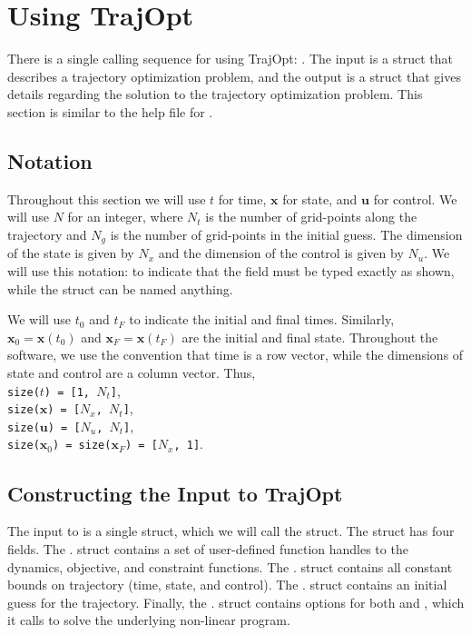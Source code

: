 \section{Using TrajOpt}

There is a single calling sequence for using TrajOpt:  . The input  is a struct that describes a trajectory optimization problem, and the output  is a struct that gives details regarding the solution to the trajectory optimization problem. This section is similar to the help file for .

\subsection{Notation}

Throughout this section we will use $t$ for time, $\bm{x}$ for state, and $\bm{u}$ for control. We will use $N$ for an integer, where $N_t$ is the number of grid-points along the trajectory and $N_g$ is the number of grid-points in the initial guess. The dimension of the state is given by $N_x$ and the dimension of the control is given by $N_u$. We will use this notation:  to indicate that the field  must be typed exactly as shown, while the struct  can be named anything.

\par We will use $t_0$ and $t_F$ to indicate the initial and final times. Similarly, $\bm{x}_0 = \bm{x}(t_0)$ and $\bm{x}_F = \bm{x}(t_F)$ are the initial and final state. Throughout the software, we use the convention that time is a row vector, while the dimensions of state and control are a column vector. Thus, \\
\texttt{size($t$) = [1, $N_t$]}, \\
\texttt{size($\bm{x}$) = [$N_x$, $N_t$]}, \\
\texttt{size($\bm{u}$) = [$N_u$, $N_t$]}, \\
\texttt{size($\bm{x}_0$) = size($\bm{x}_F$)  = [$N_x$, 1]}. 


\subsection{Constructing the Input to TrajOpt}

The input to  is a single struct, which we will call the  struct. The  struct has four fields. The . struct contains a set of user-defined function handles to the dynamics, objective, and constraint functions. The . struct contains all constant bounds on trajectory (time, state, and control). The . struct contains an initial guess for the trajectory. Finally, the . struct contains options for both  and , which it calls to solve the underlying non-linear program.

